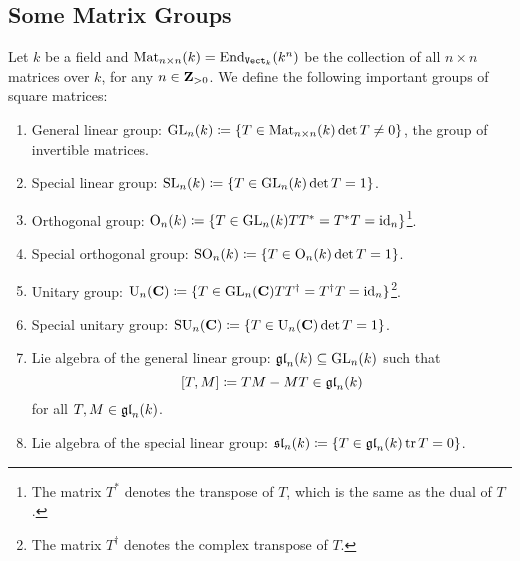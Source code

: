 \subsection{Some Matrix Groups}

\begin{example}
    \label{exp:important-matrix-groups}
    Let \(k\) be a field and \(\operatorname{Mat}_{n \times n}(k) = \operatorname{End}_{{\texttt{Vect}}_k}(k^n)\) be the
    collection of all \(n \times n\) matrices over \(k\), for any \(n \in \mathbf{Z}_{>
        0}\). We define the following important groups of square matrices:
    \begin{enumerate}\setlength\itemsep{0em}
        \item General linear group: \(\operatorname{GL}_n(k) \coloneq \{T \in \operatorname{Mat}_{n \times n}(k)
              \relax \det T \neq 0\}\), the group of invertible matrices.

        \item Special linear group: \(\operatorname{SL}_n(k) \coloneq \{T \in \operatorname{GL}_n(k) \relax \det T =
              1\}\).

        \item Orthogonal group: \(\operatorname{O}_n(k) \coloneq \{T \in \operatorname{GL}_n(k) \relax T T^{*} =
              T^{*} T = \operatorname{id}_n\}\)\footnote{The matrix \(T^{*}\) denotes the transpose of
                  \(T\), which is the same as the dual of \(T\).}.

        \item Special orthogonal group: \(\operatorname{SO}_n(k) \coloneq \{T \in \operatorname{O}_n(k) \relax
              \det T = 1\}\).

        \item Unitary group: \(\operatorname{U}_n(\mathbf{C}) \coloneq \{T \in \operatorname{GL}_n(\mathbf{C}) \relax T
              T^{\dag} = T^{\dag} T = \operatorname{id}_n\}\)\footnote{The matrix \(T^{\dag}\) denotes the
                  complex transpose of \(T\).}.

        \item Special unitary group: \(\operatorname{SU}_n(\mathbf{C}) \coloneq \{T \in \operatorname{U}_n(\mathbf{C}) \relax
              \det T = 1\}\).

        \item Lie algebra of the general linear group: \(\mathfrak{gl}_n(k) \subseteq
              \operatorname{GL}_n(k)\) such that
              \[
                  [T, M] \coloneq T M - M T \in \mathfrak{gl}_n(k)
              \]
              for all \(T, M \in \mathfrak{gl}_n(k)\).

        \item Lie algebra of the special linear group: \(\mathfrak{sl}_n(k) \coloneq \{T \in
              \mathfrak{gl}_n(k) \relax \operatorname{tr} T = 0\}\).


\end{enumerate}
\end{example}
